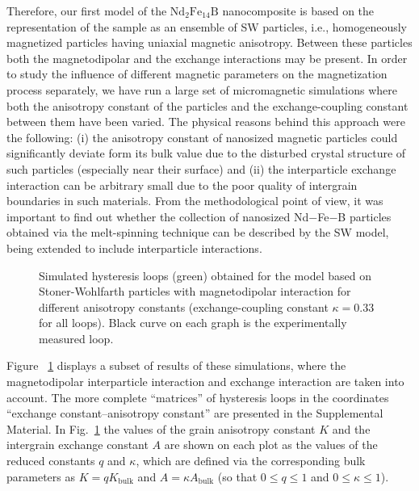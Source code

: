 \documentclass[prm,twocolumn,showkeys,preprintnumbers,amsmath,amssymb,superscriptaddress,aps,10pt]{revtex4-1}
\begin{document}
Therefore, our first model of the $\mathrm{Nd}_2\mathrm{Fe}_{14}\mathrm{B}$ nanocomposite is based on the representation of the sample as an ensemble of SW particles, i.e., homogeneously magnetized particles having uniaxial magnetic anisotropy. Between these particles both the magnetodipolar and the exchange interactions may be present. In order to study the influence of different magnetic parameters on the magnetization process separately, we have run a large set of micromagnetic simulations where both the anisotropy constant of the particles and the exchange-coupling constant between them have been varied. The physical reasons behind this approach were the following: (i) the anisotropy constant of nanosized magnetic particles could significantly deviate form its bulk value due to the disturbed crystal structure of such particles (especially near their surface) and (ii) the interparticle exchange interaction can be arbitrary small due to the poor quality of intergrain boundaries in such materials. From the methodological point of view, it was important to find out whether the collection of nanosized Nd$-$Fe$-$B particles obtained via the melt-spinning technique can be described by the SW model, being extended to include interparticle interactions.

\begin{figure}[htb]
\centering
{}
\caption{Simulated hysteresis loops (green) obtained for the model based on Stoner-Wohlfarth particles with magnetodipolar interaction for different anisotropy constants (exchange-coupling constant $\kappa = 0.33$ for all loops). Black curve on each graph is the experimentally measured loop.}
\label{HystSWwithdipoleKAPPA033}
\end{figure}
Figure ~\ref{HystSWwithdipoleKAPPA033} displays a subset of results of these simulations, where the magnetodipolar interparticle interaction and exchange interaction are taken into account. The more complete ``matrices'' of hysteresis loops in the coordinates ``exchange constant--anisotropy constant'' are presented in the Supplemental Material. In Fig.~\ref{HystSWwithdipoleKAPPA033} the values of the grain anisotropy constant $K$ and the intergrain exchange constant $A$ are shown on each plot as the values of the reduced constants $q$ and $\kappa$, which are defined via the corresponding bulk parameters as $K = q K_{\mathrm{bulk}}$ and $A = \kappa A_{\mathrm{bulk}}$ (so that $0 \leq q \leq 1$ and $0 \leq \kappa \leq 1$). 
\end{document}
